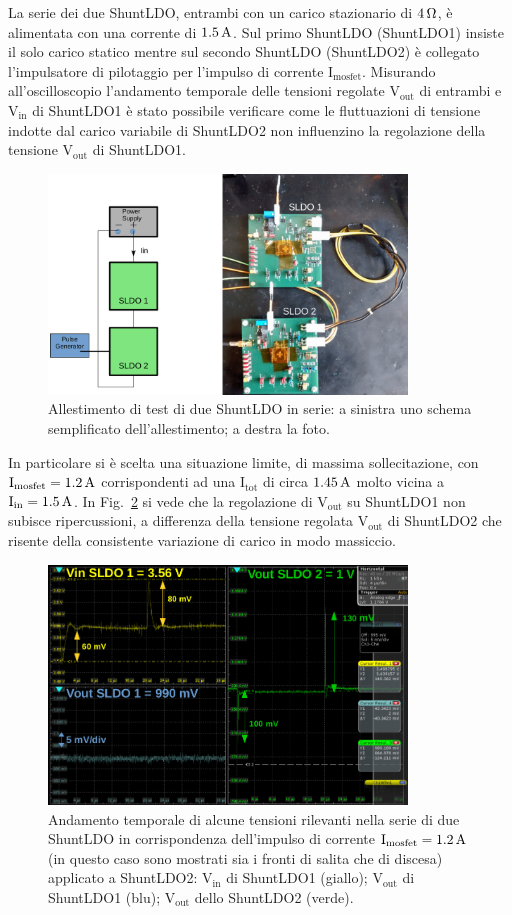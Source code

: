 La serie dei due ShuntLDO, entrambi con un carico stazionario di $4 {\rm \, \Omega}$, è alimentata con una corrente di $1.5\rm \, A$. Sul primo ShuntLDO (ShuntLDO1) insiste il solo carico statico mentre sul secondo ShuntLDO (ShuntLDO2) è collegato l'impulsatore di pilotaggio per l'impulso di corrente $\mathrm{I_{mosfet}}$.
Misurando all'oscilloscopio l'andamento temporale delle tensioni regolate $\mathrm{V_{out}}$ di entrambi e $\mathrm{V_{in}}$ di ShuntLDO1 è stato possibile verificare come le fluttuazioni di tensione indotte dal carico variabile di ShuntLDO2 non influenzino la regolazione della tensione $\mathrm{V_{out}}$ di ShuntLDO1.
\begin{figure}[t]
\centering
\includegraphics[width=0.85\textwidth]{Immagini/SLDOserie}
\caption{Allestimento di test di due ShuntLDO in serie: a sinistra uno schema semplificato dell'allestimento; a destra la foto.}
\label{SLDOserie}
\end{figure}
In particolare si \`e scelta una situazione limite, di massima sollecitazione, con $\mathrm{I_{mosfet}} = 1.2 \rm \, A$ corrispondenti ad una $\mathrm{I_{tot}}$ di circa $1.45 \rm \, A$ molto vicina a $\mathrm{I_{in}} = 1.5 \rm \, A$. In Fig.~\ref{ScreenSerie} si vede che la regolazione di $\mathrm{V_{out}}$ su ShuntLDO1 non subisce ripercussioni, a differenza della tensione regolata $\mathrm{V_{out}}$ di ShuntLDO2 che risente della consistente variazione di carico in modo massiccio.
\begin{figure}[!h]
\centering
\includegraphics[width=0.85\textwidth]{Immagini/ScreenSerie}
\caption{Andamento temporale di alcune tensioni rilevanti nella serie di due ShuntLDO in corrispondenza dell'impulso di corrente $\mathrm{I_{mosfet}} = 1.2 \rm \, A$ (in questo caso sono mostrati sia i fronti di salita che di discesa) applicato a ShuntLDO2: $\mathrm{V_{in}}$ di ShuntLDO1 (giallo); $\mathrm{V_{out}}$ di ShuntLDO1 (blu); $\mathrm{V_{out}}$ dello ShuntLDO2 (verde).}
\label{ScreenSerie}
\end{figure}
